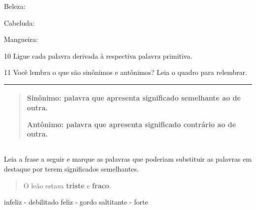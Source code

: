 \begin{boxlist}
\begin{escolha}
\item Beleza: 

\item Cabeluda: 

\item Mangueira: 
\end{escolha}

\num{10} Ligue cada palavra derivada à respectiva palavra primitiva.

\begin{multicols}







\end{multicols}


\num{11} Você lembra o que são sinônimos e antônimos? Leia o quadro para
relembrar.


\begin{longtable}[]{@{}l@{}}
\toprule
\begin{minipage}[t]{0.97\columnwidth}\raggedright\strut
\begin{quote}
\textbf{Sinônimo}: palavra que apresenta significado semelhante ao de
outra.

\textbf{Antônimo}: palavra que apresenta significado contrário ao de
outra.
\end{quote}\strut
\end{minipage}\tabularnewline
\bottomrule
\end{longtable}

\begin{escolha}
\item Leia a frase a seguir e marque as palavras que poderiam substituir as
palavras em destaque por terem significados semelhantes.

\begin{quote}
O leão estava \textbf{triste} e \textbf{fraco}.
\end{quote}

\begin{boxlist}
\boxitem[X] infeliz - debilitado
\boxitem[] feliz - gordo
\boxitem[] saltitante - forte
\end{boxlist}


\end{escolha}
\end{boxlist}
